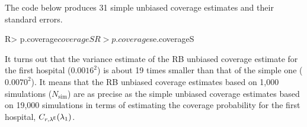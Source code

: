 \documentclass[article]{jss}
\begin{document}
The code below produces 31 simple unbiased coverage estimates and their standard errors.
\begin{CodeChunk}
\begin{CodeInput}
R> p.coverage$coverageS
R> p.coverage$se.coverageS
\end{CodeInput}
\end{CodeChunk}



It turns out that the variance estimate of the RB unbiased coverage estimate for the first hospital ($0.0016^2$) is about 19 times smaller than that of the simple one ($0.0070^2$). It means that the RB unbiased coverage estimates based on 1,000 simulations ($N_{\textrm{sim}}$) are as precise as the simple unbiased coverage estimates based on 19,000 simulations in terms of estimating the coverage probability for the first hospital, $C_{r, \lambda^{\mathsf{E}}}(\lambda_1)$.
\end{document}
